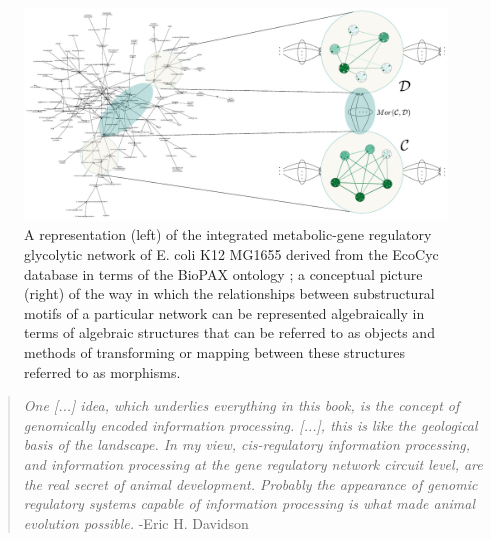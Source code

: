 \begin{frame}
\begin{figure}
\noindent\includegraphics[width=0.8\framewidth]{fig/biograph.pdf}
\caption{A representation (left) of the integrated metabolic-gene regulatory glycolytic network of E. coli K12 MG1655 derived from the EcoCyc database \cite{Keseler2011} in terms of the BioPAX ontology  \cite{Demir2010}; a conceptual picture (right) of the way in which the relationships between substructural motifs of a particular network can be represented algebraically in terms of algebraic structures that can be referred to as objects and methods of transforming or mapping between these structures referred to as morphisms.}
\label{fig:biograph}
\end{figure}
\end{frame}

\begin{frame}
\begin{quotation}
{\it One [...] idea, which underlies everything in this book, is the concept
of genomically encoded information processing. [...],
this is like the geological basis of the landscape. In my view, cis-regulatory information processing, and information processing at the gene regulatory network circuit level, are the real secret of animal development. Probably the appearance of genomic regulatory systems capable of information processing is what made animal evolution possible.} -Eric H. Davidson \cite{Davidson2006a}
\end{quotation}
\end{frame}

